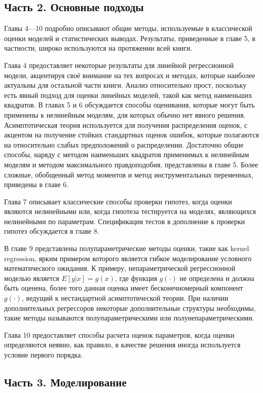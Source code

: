 \subsection{Часть 2. Основные подходы}

	Главы 4---10 подробно описывают общие методы, используемые в классической оценки моделей и статистических выводах. Результаты, приведенные в главе 5, в частности, широко используются на протяжении всей книги.
	
	
	Глава 4 предоставляет некоторые результаты для линейной регрессионной модели, акцентируя своё внимание на тех вопросах и методах, которые наиболее актуальны для остальной части книги. Анализ относительно прост, поскольку есть явный подход для оценки линейных моделей, такой как метод наименьших квадратов.
	В главах 5 и 6 обсуждается способы оценивания, которые могут быть применены к нелинейным моделям, для которых обычно нет явного решения. Асимптотическая теория используется для получения распределения оценок, с акцентом на получение стойких стандартных оценок ошибок, которые полагаются на относительно слабых предположений о распределении. Достаточно общие способы, наряду с  методом наименьших квадратов применимых к нелинейным моделям и методом максимального правдоподобия, представлены в главе 5. Более сложные, обобщенный метод моментов и метод инструментальных переменных, приведены в главе 6.
	
	
	Глава 7 описывает классические способы проверки гипотез, когда оценки являются нелинейными или, когда гипотеза тестируется на моделях, являющихся нелинейными по параметрам. Спецификация тестов в дополнение к проверки гипотез обсуждается в главе 8.
	
	
	В главе 9 представлены полупараметрические методы оценки, такие как kernel regression, ярким примером которого является гибкое моделирование условного математического ожидания. К примеру, непараметрической регрессионной моделью является $E[y|x] = g(x)$, где функция $g(\cdot)$ не определена и должна быть оценена, более того данная оценка имеет бесконечномерный компонент $g(\cdot)$, ведущий к нестандартной асимптотической теории. При наличии дополнительных регрессоров некоторые дополнительные структуры необходимы, такие методы называются полупараметрическими или полунепараметрическими.
	
	
	Глава 10 предоставляет способы расчета оценок параметров, когда оценки определяются неявно, как правило, в качестве решения иногда используется условие первого порядка.

\subsection{Часть 3. Моделирование}
	
